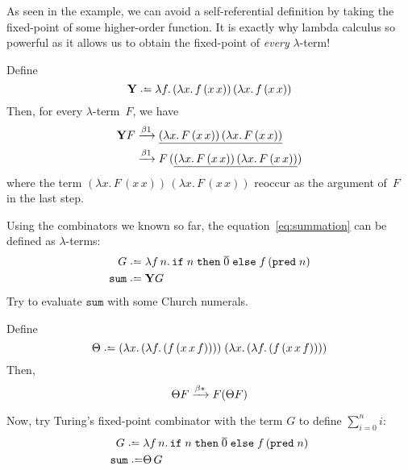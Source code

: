 As seen in the example, we can avoid a self-referential definition by taking the
fixed-point of some higher-order function. It is exactly why lambda calculus so
powerful as it allows us to obtain the fixed-point of \emph{every}
$\lambda$-term!
\begin{proposition}
  Define
  \[
    \mathbf{Y} \defeq
    \lambda f.\, (\lambda x.\, f\,(x\,x))\,(\lambda x.\,f\,(x\,x))
  \]
  Then, for every $\lambda$-term~$F$, we have
  \begin{align*}
    \mathbf{Y}F
    & \xrightarrow{\beta1} \underline{(\lambda x.\,F\,(x\,x))\,(\lambda x.\, F\,(x\,x))} \\
    & \xrightarrow{\beta1} F\,(\underline{(\lambda x.\,F\,(x\,x))\,(\lambda x.\,
      F\,(x\,x))})
  \end{align*}
  where the term $(\lambda x.\,F\,(x\,x))\,(\lambda x.\, F\,(x\,x))$
  reoccur as the argument of~$F$ in the last step.
\end{proposition}
\begin{example}
  Using the combinators we known so far, the equation~\eqref{eq:summation}
  can be defined as $\lambda$-terms:
  \begin{align*}
    G \defeq{} &
    \lambda f\,n.\, \mathtt{if}\;n\;\mathtt{then}\;\overline{0}\;\mathtt{else}\;
    f\,(\mathtt{pred}\;n) \\
    \mathtt{sum} \defeq{} & \mathbf{Y}G
  \end{align*}
  Try to evaluate $\mathtt{sum}$ with some Church numerals.
\end{example}

\begin{proposition}
  Define 
  \[
    \Theta \defeq 
    (\lambda x.\,(\lambda f.\,(f\,(x\,x\,f))))\;
    (\lambda x.\,(\lambda f.\,(f\,(x\,x\,f))))
  \]
  Then, 
  \[
    \Theta F \xrightarrow{\beta*} F (\Theta F)
  \]
\end{proposition}
\begin{example}
  Now, try Turing's fixed-point combinator with the term $G$ to define
  $\sum_{i=0}^n i$:
  \begin{align*}
    G \defeq{} &
    \lambda f\,n.\,
    \mathtt{if}\;n\;\mathtt{then}\;\overline{0}\;\mathtt{else}\;
    f\,(\mathtt{pred}\;n) \\
    \mathtt{sum} \defeq & \Theta\,G \\
  \end{align*}
\end{example}

